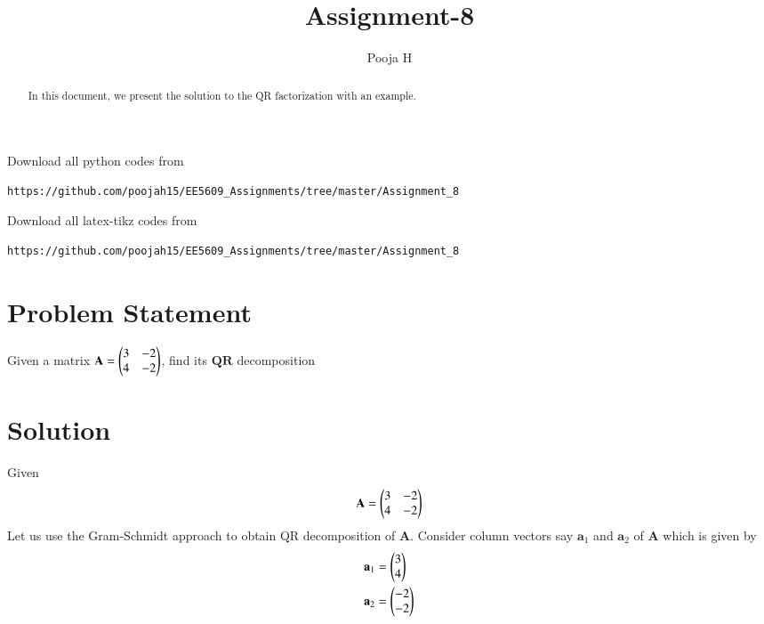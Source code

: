 \documentclass[journal,12pt,twocolumn]{IEEEtran}
\begin{document}
\let\vec\mathbf
\renewcommand{\thefigure}{\theproblem}
\def\putbox#1#2#3{\makebox[0in][l]{\makebox[#1][l]{}\raisebox{\baselineskip}[0in][0in]{\raisebox{#2}[0in][0in]{#3}}}}
     \def\rightbox#1{\makebox[0in][r]{#1}}
     \def\centbox#1{\makebox[0in]{#1}}
     \def\topbox#1{\raisebox{-\baselineskip}[0in][0in]{#1}}
     \def\midbox#1{\raisebox{-0.5\baselineskip}[0in][0in]{#1}}
\vspace{3cm}
\title{Assignment-8}
\author{Pooja H \\ }
\maketitle
\newpage
\bigskip
\renewcommand{\thefigure}{\theenumi}
\renewcommand{\thetable}{\theenumi}
\begin{abstract}
In this document, we present the solution to the QR factorization with an example.
\end{abstract}
Download all python codes from 
\begin{lstlisting}
https://github.com/poojah15/EE5609_Assignments/tree/master/Assignment_8
\end{lstlisting}
Download all latex-tikz codes from 
\begin{lstlisting}
https://github.com/poojah15/EE5609_Assignments/tree/master/Assignment_8
\end{lstlisting}


\section{Problem Statement}
Given a matrix $\vec{A} = \myvec{3 & -2\\4 & -2}$, find its $\vec{QR}$ decomposition

\section{Solution}
Given
\begin{align}
	\vec{A} =\myvec{3& -2 \\ 4 & -2}
\end{align}
Let us use the Gram-Schmidt approach to obtain QR decomposition of $\vec{A}$. Consider column vectors say $\vec{a}_1$ and $\vec{a}_2$ of $\vec{A}$ which is given by
\begin{align}
	\vec{a}_1 &=\myvec{3 \\ 4} \\
	\vec{a}_2 &=\myvec{-2 \\ -2}
\end{align}
\end{document}
